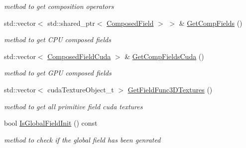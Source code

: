 \begin{DoxyCompactItemize}
\begin{DoxyCompactList}\small\item\em method to get composition operators \end{DoxyCompactList}\item 
std\+::vector$<$ std\+::shared\+\_\+ptr$<$ \hyperlink{classComposedField}{Composed\+Field} $>$ $>$ \& \hyperlink{classGlobalFieldFunction_a8e2de1aaa09f16e7aa8337e74a456454}{Get\+Comp\+Fields} ()\hypertarget{classGlobalFieldFunction_a8e2de1aaa09f16e7aa8337e74a456454}{}\label{classGlobalFieldFunction_a8e2de1aaa09f16e7aa8337e74a456454}

\begin{DoxyCompactList}\small\item\em method to get C\+PU composed fields \end{DoxyCompactList}\item 
std\+::vector$<$ \hyperlink{classComposedFieldCuda}{Composed\+Field\+Cuda} $>$ \& \hyperlink{classGlobalFieldFunction_a2b5afb30913aede665c40442ba25d8b3}{Get\+Comp\+Fields\+Cuda} ()\hypertarget{classGlobalFieldFunction_a2b5afb30913aede665c40442ba25d8b3}{}\label{classGlobalFieldFunction_a2b5afb30913aede665c40442ba25d8b3}

\begin{DoxyCompactList}\small\item\em method to get G\+PU composed fields \end{DoxyCompactList}\item 
std\+::vector$<$ cuda\+Texture\+Object\+\_\+t $>$ \hyperlink{classGlobalFieldFunction_a312f448c044ddc61bab523d3b1b20e8a}{Get\+Field\+Func3\+D\+Textures} ()\hypertarget{classGlobalFieldFunction_a312f448c044ddc61bab523d3b1b20e8a}{}\label{classGlobalFieldFunction_a312f448c044ddc61bab523d3b1b20e8a}

\begin{DoxyCompactList}\small\item\em method to get all primitive field cuda textures \end{DoxyCompactList}\item 
bool \hyperlink{classGlobalFieldFunction_afb382b93bcd536d5649c7303296bb7df}{Is\+Global\+Field\+Init} () const \hypertarget{classGlobalFieldFunction_afb382b93bcd536d5649c7303296bb7df}{}\label{classGlobalFieldFunction_afb382b93bcd536d5649c7303296bb7df}

\begin{DoxyCompactList}\small\item\em method to check if the global field has been genrated \end{DoxyCompactList}\end{DoxyCompactItemize}



